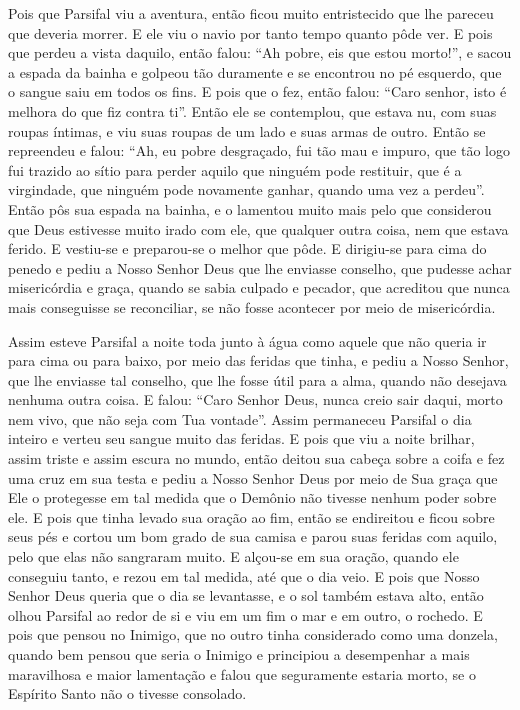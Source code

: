 Pois que Parsifal viu a aventura, então ficou muito entristecido que lhe
pareceu que deveria morrer. E ele viu o navio por tanto tempo quanto pôde ver.
E pois que perdeu a vista daquilo, então falou: “Ah pobre, eis que estou
morto!”, e sacou a espada da bainha e golpeou tão duramente e se encontrou no
pé esquerdo, que o sangue saiu em todos os fins. E pois que o fez, então falou:
“Caro senhor, isto é melhora do que fiz contra ti”. Então ele se contemplou,
que estava nu, com suas roupas íntimas, e viu suas roupas de um lado e suas
armas de outro. Então se repreendeu e falou: “Ah, eu pobre desgraçado, fui tão
mau e impuro, que tão logo fui trazido ao sítio para perder aquilo que ninguém
pode restituir, que é a virgindade, que ninguém pode novamente ganhar, quando
uma vez a perdeu”.  Então pôs sua espada na bainha, e o lamentou muito
mais pelo que considerou que Deus estivesse muito irado com ele, que qualquer
outra coisa, nem que estava ferido. E vestiu-se e preparou-se o melhor que
pôde. E dirigiu-se para cima do penedo e pediu a Nosso Senhor Deus que lhe
enviasse conselho, que pudesse achar misericórdia e graça, quando se sabia
culpado e pecador, que acreditou que nunca mais conseguisse se reconciliar, se
não fosse acontecer por meio de misericórdia. 

Assim esteve Parsifal a noite toda junto à água como aquele que não queria
ir para cima ou para baixo, por meio das feridas que tinha, e pediu a Nosso
Senhor, que lhe enviasse tal conselho, que lhe fosse útil para a alma, quando
não desejava nenhuma outra coisa. E falou: “Caro Senhor Deus, nunca creio sair
daqui, morto nem vivo, que não seja com Tua vontade”.  Assim permaneceu
Parsifal o dia inteiro e verteu seu sangue muito das feridas. E pois que viu a
noite brilhar, assim triste e assim escura no mundo, então deitou sua cabeça
sobre a coifa e fez uma cruz em sua testa e pediu a Nosso Senhor Deus por meio
de Sua graça que Ele o protegesse em tal medida que o Demônio não tivesse
nenhum poder sobre ele. E pois que tinha levado sua oração ao fim, então se
endireitou e ficou sobre seus pés e cortou um bom grado de sua camisa e parou
suas feridas com aquilo,  pelo que elas não sangraram muito. E alçou-se em sua
oração, quando ele conseguiu tanto, e rezou em tal medida, até que o dia veio.
E pois que Nosso Senhor Deus queria que o dia se levantasse, e o sol também
estava alto, então olhou Parsifal ao redor de si e viu em um fim o mar e em
outro, o rochedo. E pois que pensou no Inimigo, que no outro tinha considerado
como uma donzela, quando bem pensou que seria o Inimigo e principiou a
desempenhar a mais maravilhosa e maior lamentação e falou que seguramente
estaria morto, se o Espírito Santo não o tivesse consolado.

